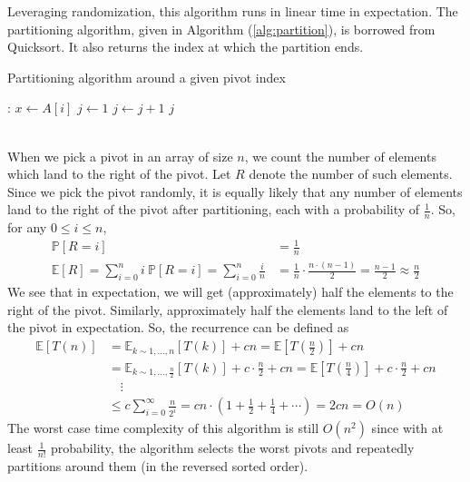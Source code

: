 \documentclass[9pt]{article}
\begin{document}
Leveraging randomization, this algorithm runs in linear time in expectation.
The partitioning algorithm, given in Algorithm (\ref{alg:partition}), is borrowed from
Quicksort. It also returns the index at which the partition ends.
\begin{algorithm}
    \caption{Partitioning algorithm around a given pivot index}
    \label{alg:partition}
    \begin{algorithmic}[1]
        :
            \State $x \gets A[i]$
            \State $j \gets 1$
                    \State {}
                    \State $j \gets j + 1$
                \EndIf
            \EndFor
            \State {}
            \State \Return $j$
        \EndProcedure
    \end{algorithmic}
\end{algorithm}
\vspace*{0pt} \\
When we pick a pivot in an array of size $n$, we count the number of elements
which land to the right of the pivot. Let $R$ denote the number of such elements.
Since we pick the pivot randomly, it is equally likely that any number of elements
land to the right of the pivot after partitioning, each with a probability of
$\frac{1}{n}$. So, for any $0 \leq i \leq n$,
\begin{align}
    \label{R}
    \mathbb{P}[R = i] &= \frac{1}{n} \\
    \label{exp-R}
    \mathbb{E}[R] = \sum_{i=0}^{n} i \ \mathbb{P}[R = i] = \sum_{i=0}^{n} \frac{i}{n}
    &= \frac{1}{n} \cdot \frac{n \cdot (n-1)}{2} = \frac{n-1}{2} \approx \frac{n}{2}
\end{align}
We see that in expectation, we will get (approximately) half the elements to the
right of the pivot. Similarly, approximately half the elements land to the left
of the pivot in expectation. So, the recurrence can be defined as
\begin{equation}
    \label{exp-Tn-rand-quickselect}
    \begin{split}
        \mathbb{E}[T(n)] &= \mathbb{E}_{k \sim 1, \dots, n}[T(k)] + cn = \mathbb{E}\left[T\left( \frac{n}{2} \right)\right] + cn \\
        &= \mathbb{E}_{k \sim 1, \dots, \frac{n}{2}}[T(k)] + c \cdot \frac{n}{2} + cn
        = \mathbb{E}\left[T\left( \frac{n}{4} \right)\right] + c \cdot \frac{n}{2} + cn \\
        &\quad \vdots \\
        &\leq c \sum_{i=0}^{\infty} \frac{n}{2^{i}} = cn \cdot \left( 1 + \frac{1}{2} + \frac{1}{4} + \cdots \right) = 2c n = O(n)
    \end{split}
\end{equation}
The worst case time complexity of this algorithm is still $O(n^{2})$ since
with at least $\frac{1}{n!}$ probability, the algorithm selects the worst pivots
and repeatedly partitions around them (in the reversed sorted order).
\end{document}
